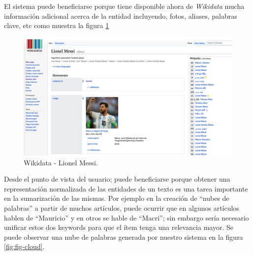 \documentclass[12pt,a4paper,]{scrartcl}
\begin{document}
El sistema puede beneficiarse porque tiene disponible ahora de \emph{Wikidata} mucha información adicional acerca de la entidad incluyendo, fotos, aliases, palabras clave, etc como muestra la figura \ref{fig:fig-messi}

\begin{figure}[H]

{\centering \includegraphics{assets/wikidata_messi.pdf} 

}

\caption{Wikidata - Lionel Messi.}\label{fig:fig-messi}
\end{figure}

Desde el punto de vista del usuario; puede beneficiarse porque obtener una representación normalizada de las entidades de un texto es una tarea importante en la sumarización de las mismas. Por ejemplo en la creación de \enquote{nubes de palabras} a partir de muchos artículos, puede ocurrir que en algunos artículos hablen de \enquote{Mauricio} y en otros se hable de \enquote{Macri}; sin embargo sería necesario unificar estos dos keywords para que el ítem tenga una relevancia mayor. Se puede observar una nube de palabras generada por nuestro sistema en la figura \ref{fig:fig-cloud}.
\end{document}
